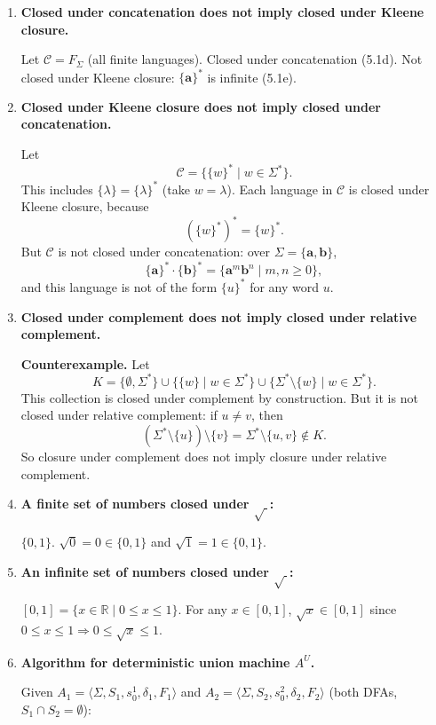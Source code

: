 \begin{enumerate}[{5.}1. ]
\item \textbf{Closed under concatenation does not imply closed under Kleene closure.}

Let $\mathcal{C}=F_\Sigma$ (all finite languages).  Closed under concatenation (5.1d).  Not closed under Kleene closure: $\{\pmb{a}\}^*$ is infinite (5.1e).

\item \textbf{Closed under Kleene closure does not imply closed under concatenation.}

Let
\[
\mathcal{C}=\{\{w\}^*\mid w\in\Sigma^*\}.
\]
This includes $\{\lambda\}=\{\lambda\}^*$ (take $w=\lambda$).  Each language in
$\mathcal{C}$ is closed under Kleene closure, because
\[
(\{w\}^*)^*=\{w\}^*.
\]
But $\mathcal{C}$ is not closed under concatenation: over
$\Sigma=\{\pmb{a},\pmb{b}\}$,
\[
\{\pmb{a}\}^*\cdot\{\pmb{b}\}^*=\{\pmb{a}^m\pmb{b}^n\mid m,n\ge 0\},
\]
and this language is not of the form $\{u\}^*$ for any word $u$.

\item \textbf{Closed under complement does not imply closed under relative complement.}

\textbf{Counterexample.}  Let
\[
K=\{\emptyset,\Sigma^*\}\cup\{\{w\}\mid w\in\Sigma^*\}\cup
\{\Sigma^*\setminus\{w\}\mid w\in\Sigma^*\}.
\]
This collection is closed under complement by construction.  But it is not
closed under relative complement: if $u\neq v$, then
\[
(\Sigma^*\setminus\{u\})\setminus\{v\}=\Sigma^*\setminus\{u,v\}\notin K.
\]
So closure under complement does not imply closure under relative complement.

\item \textbf{A finite set of numbers closed under $\sqrt{\ }$:}

$\{0,1\}$.  $\sqrt{0}=0\in\{0,1\}$ and $\sqrt{1}=1\in\{0,1\}$.

\item \textbf{An infinite set of numbers closed under $\sqrt{\ }$:}

$[0,1]=\{x\in\mathbb{R}\mid 0\le x\le 1\}$.  For any $x\in[0,1]$, $\sqrt{x}\in[0,1]$ since $0\le x\le 1\Rightarrow 0\le\sqrt{x}\le 1$.

\item \textbf{Algorithm for deterministic union machine $A^U$.}

Given $A_1=\langle\Sigma,S_1,s^1_0,\delta_1,F_1\rangle$ and $A_2=\langle\Sigma,S_2,s^2_0,\delta_2,F_2\rangle$ (both DFAs, $S_1\cap S_2=\emptyset$):


\end{enumerate}
